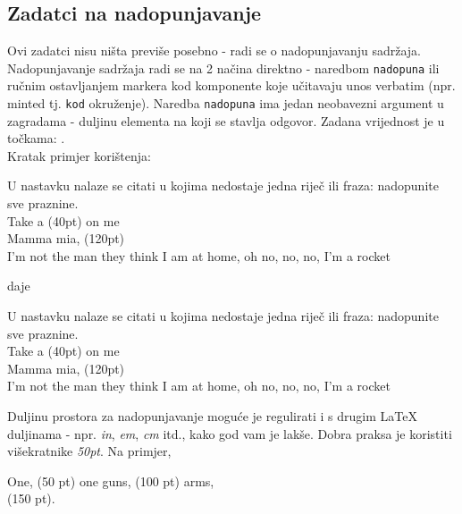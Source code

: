\documentclass{studosi-workbook}
\begin{document}
	\subsection{Zadatci na nadopunjavanje}
	Ovi zadatci nisu ništa previše posebno - radi se o nadopunjavanju sadržaja. Nadopunjavanje sadržaja radi se na 2 načina direktno - naredbom \texttt{nadopuna} ili ručnim ostavljanjem markera kod komponente koje učitavaju unos verbatim (npr. minted tj. \texttt{kod} okruženje). Naredba \texttt{nadopuna} ima jedan neobavezni argument u zagradama - duljinu elementa na koji se stavlja odgovor. Zadana vrijednost je u točkama: \textbf{\nadopunawidth}. \\
	
	Kratak primjer korištenja:
	
	\begin{kod}
	\begin{zadatak}
		U nastavku nalaze se citati u kojima nedostaje jedna riječ ili fraza: nadopunite sve praznine. \\
		
		Take a \nadopuna(40pt) on me \\
		Mamma mia, \nadopuna(120pt) \\
		I'm not the man they think I am at home, oh no, no, no, I'm a rocket \nadopuna
	\end{zadatak}
	\end{kod}

	daje
	
	\begin{zadatak}
		U nastavku nalaze se citati u kojima nedostaje jedna riječ ili fraza: nadopunite sve praznine. \\
		
		Take a \nadopuna(40pt) on me \\
		Mamma mia, \nadopuna(120pt) \\
		I'm not the man they think I am at home, oh no, no, no, I'm a rocket \nadopuna
	\end{zadatak}
	\vspace*{20pt}
	
	Duljinu prostora za nadopunjavanje moguće je regulirati i s drugim LaTeX duljinama - npr. \textit{in}, \textit{em}, \textit{cm} itd., kako god vam je lakše. Dobra praksa je koristiti višekratnike \textit{50pt}. Na primjer,
	
	\begin{kod}
	One, \nadopuna(50 pt) one guns, \nadopuna(100 pt) arms, \\
	\nadopuna(150 pt).
	\end{kod}
\end{document}
